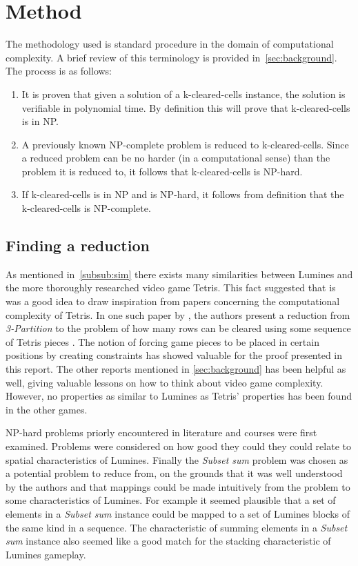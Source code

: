 \section{Method}
\label{method}

The methodology used is standard procedure in the domain of computational complexity. A brief review of this terminology is provided in~\autoref{sec:background}.
The process is as follows:

\begin{enumerate}
\item It is proven that given a solution of a k-cleared-cells instance, the solution is verifiable in polynomial time. By definition this will prove that k-cleared-cells is in NP.
\item A previously known NP-complete problem is reduced to k-cleared-cells. Since a reduced problem can be no harder (in a computational sense) than the problem it is reduced to, it follows that k-cleared-cells is NP-hard.
\item If k-cleared-cells is in NP and is NP-hard, it follows from definition that the k-cleared-cells is NP-complete.
\end{enumerate}

\subsection{Finding a reduction}
As mentioned in~\autoref{subsub:sim} there exists many similarities between Lumines and the more thoroughly researched video game Tetris. This fact suggested that is was a good idea to draw inspiration from papers concerning the computational complexity of Tetris. In one such paper by \citeauthor{tetris}, the authors present a reduction from \textit{3-Partition} to the problem of how many rows can be cleared using some sequence of Tetris pieces \cite{tetris}. The notion of forcing game pieces to be placed in certain positions by creating constraints has showed valuable for the proof presented in this report. The other reports mentioned in \autoref{sec:background} has been helpful as well, giving valuable lessons on how to think about video game complexity. However, no properties as similar to Lumines as Tetris' properties has been found in the other games.

NP-hard problems priorly encountered in literature and courses were first examined. Problems were considered on how good they could they could relate to spatial characteristics of Lumines. Finally the \textit{Subset sum} problem was chosen as a potential problem to reduce from, on the grounds that it was well understood by the authors and that mappings could be made intuitively from the problem to some characteristics of Lumines. For example it seemed plausible that a set of elements in a \textit{Subset sum} instance could be mapped to a set of Lumines blocks of the same kind in a sequence. The characteristic of summing elements in a \textit{Subset sum} instance also seemed like a good match for the stacking characteristic of Lumines gameplay.
